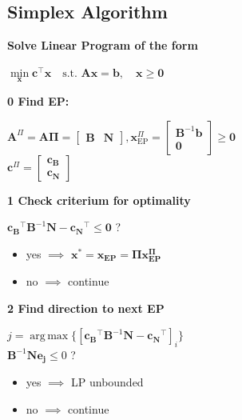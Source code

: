 \documentclass[english]{latex4ei/latex4ei_sheet}
\DeclareMathOperator*{\argmax}{arg\,max}
\begin{document}
\begin{sectionbox}
	\subsection{Simplex Algorithm}
	\textbf{Solve Linear Program of the form}
	\begin{emphbox}
		$\min\limits_{\bm{x}} \bm{c}^\intercal\bm{x} \quad \text{s.t. } \bm{A}\bm{x} = \bm{b}, \quad \bm{x}\geq \bm{0}$
	\end{emphbox}
	\vspace{0.5em}
	\textbf{0 Find EP:} \\
	\begin{center}
		$\bm{A}^{\Pi} = \bm{A}\bm{\Pi} = \begin{bmatrix}
			\bm{B} & \bm{N}
		\end{bmatrix}, \bm{x}^{\Pi}_{\text{EP}} = \begin{bmatrix}
			\bm{B}^{-1}\bm{b} \\ \bm{0}
		\end{bmatrix} \geq \bm{0}$ \\
		$\bm{c}^{\Pi} = \begin{bmatrix}
			\bm{c_B} \\ \bm{c_N}
		\end{bmatrix}$
	\end{center}
	\vspace{1em}
	
	\textbf{1 Check criterium for optimality}
	\begin{emphbox}
		$\bm{c_B}^\intercal\bm{B}^{-1}\bm{N}-\bm{c_N}^\intercal \leq \bm{0}$ ?
	\end{emphbox}
	\begin{itemize}
		\item[] yes $\implies$ $\bm{x}^* = \bm{x_{\text{EP}}} = \bm{\Pi}\bm{x_{\text{EP}}^{\Pi}}$
		\item[] no $\implies$ continue
	\end{itemize}
	\vspace{1em}
	
	\textbf{2 Find direction to next EP}
	\begin{emphbox}
		$j = \argmax\{[\bm{c_B}^\intercal\bm{B}^{-1}\bm{N}-\bm{c_N}^\intercal]_{i}\}$ \\
		$\bm{B}^{-1}\bm{N}\bm{e_j} \leq 0$ ?
	\end{emphbox}
	\begin{itemize}
		\item[] yes $\implies$ LP unbounded
		\item[] no $\implies$ continue
	\end{itemize}
	\vspace{1em}
	

\end{sectionbox}
\end{document}
